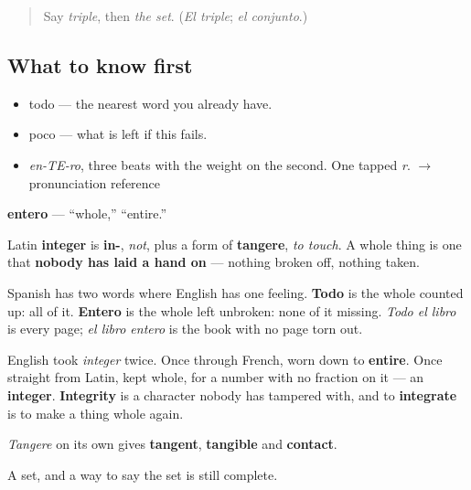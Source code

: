 \label{lesson:ES-C352-entero}



\begin{quote}
Say \emph{triple}, then \emph{the set}. (\emph{El triple}; \emph{el conjunto}.)
\end{quote}

\subsection*{What to know first}
\begin{itemize}
\raggedright
  \item todo — the nearest word you already have.
  \item poco — what is left if this fails.
\end{itemize}

\begin{sounds}
\begin{itemize}
\raggedright
  \item \emph{en-TE-ro}, three beats with the weight on the second. One tapped \emph{r}. $\to$ pronunciation reference
\end{itemize}
\end{sounds}

\begin{cousinweb}
\textbf{entero} — \textquotedblleft{}whole,\textquotedblright{} \textquotedblleft{}entire.\textquotedblright{}

Latin \textbf{integer} is \textbf{in-}, \emph{not}, plus a form of \textbf{tangere}, \emph{to touch}. A whole thing is one that \textbf{nobody has laid a hand on} — nothing broken off, nothing taken.

Spanish has two words where English has one feeling. \textbf{Todo} is the whole counted up: all of it. \textbf{Entero} is the whole left unbroken: none of it missing. \emph{Todo el libro} is every page; \emph{el libro entero} is the book with no page torn out.

English took \emph{integer} twice. Once through French, worn down to \textbf{entire}. Once straight from Latin, kept whole, for a number with no fraction on it — an \textbf{integer}. \textbf{Integrity} is a character nobody has tampered with, and to \textbf{integrate} is to make a thing whole again.

\emph{Tangere} on its own gives \textbf{tangent}, \textbf{tangible} and \textbf{contact}.
\end{cousinweb}

\begin{grammarlens}[title={What you've built}]
A set, and a way to say the set is still complete.
\end{grammarlens}

